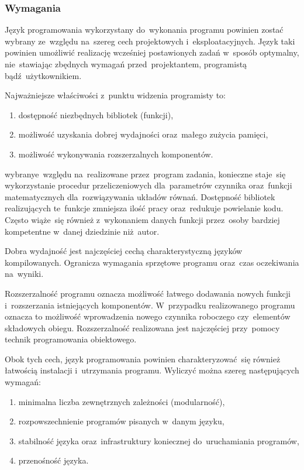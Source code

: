 \subsubsection{Wymagania}

Język programowania wykorzystany do~wykonania programu powinien zostać
wybrany ze~względu na~szereg cech projektowych i~eksploatacyjnych. Język
taki powinien umożliwić realizację wcześniej postawionych zadań w~sposób
optymalny, nie~stawiając zbędnych wymagań przed~projektantem,
programistą bądź~użytkownikiem.

Najważniejsze właściwości z~punktu widzenia programisty to:

\begin{enumerate}

	\item dostępność niezbędnych bibliotek (funkcji),

	\item możliwość uzyskania dobrej wydajności oraz~małego zużycia
	pamięci,

	\item możliwość wykonywania rozszerzalnych komponentów.

\end{enumerate}

wybranye~względu na~realizowane przez~program zadania, konieczne staje~się
wykorzystanie procedur przeliczeniowych dla~parametrów czynnika
oraz~funkcji matematycznych dla~rozwiązywania układów równań. Dostępność
bibliotek realizujących te~funkcje zmniejsza ilość pracy oraz~redukuje
powielanie kodu. Często wiąże~się również z~wykonaniem danych funkcji
przez~osoby bardziej kompetentne w~danej dziedzinie niż~autor.

Dobra wydajność jest najczęściej cechą charakterystyczną języków
kompilowanych. Ogranicza wymagania sprzętowe programu oraz~czas
oczekiwania na~wyniki.

Rozszerzalność programu oznacza możliwość łatwego dodawania nowych
funkcji i~rozszerzania istniejących komponentów. W~przypadku
realizowanego programu oznacza to możliwość wprowadzenia nowego czynnika
roboczego czy~elementów składowych obiegu. Rozszerzalność realizowana
jest najczęściej przy~pomocy technik programowania obiektowego.

Obok tych cech, język programowania powinien charakteryzować~się również
łatwością instalacji i~utrzymania programu. Wyliczyć można szereg
następujących wymagań:

\begin{enumerate}

	\item minimalna liczba zewnętrznych zależności (modularność),

	\item rozpowszechnienie programów pisanych w~danym języku,

	\item stabilność języka oraz~infrastruktury koniecznej
	do~uruchamiania programów,

	\item przenośność języka.

\end{enumerate}

